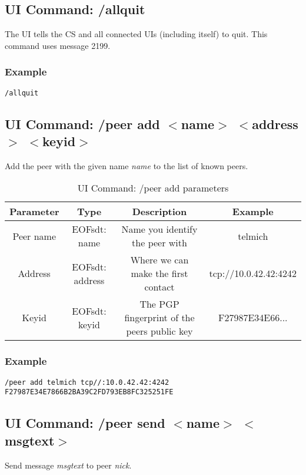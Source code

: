 \subsection{UI Command: /allquit}
The UI tells the CS and all connected UIs (including itself) to quit.
This command uses message 2199.
\subsubsection{Example}
\begin{verbatim}
/allquit
\end{verbatim}
\subsection{UI Command: /peer add $<$name$>$ $<$address$>$ $<$keyid$>$}
Add the peer with the given name \textit{name} to the list of known peers.

%
\begin{longtable}{|c|c|c|c|}
\caption{UI Command: /peer add parameters}\\
\hline
\textbf{Parameter} & \textbf{Type} & \textbf{Description} & \textbf{Example}\\
\hline
Peer name & EOFsdt: name & Name you identify the peer with & telmich\\
\hline
Address & EOFsdt: address & Where we can make the first contact & tcp://10.0.42.42:4242\\
\hline
Keyid & EOFsdt: keyid & The PGP fingerprint of the peers public key & F27987E34E66...\\
\hline
\end{longtable}

\subsubsection{Example}
\begin{verbatim}
/peer add telmich tcp//:10.0.42.42:4242 F27987E34E7866B2BA39C2FD793EB8FC325251FE
\end{verbatim}
\subsection{UI Command: /peer send $<$name$>$ $<$msgtext$>$}
Send message \textit{msgtext} to peer \textit{nick}.

